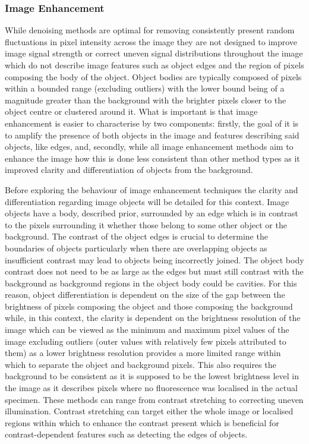 \subsubsection{Image Enhancement}
While denoising methods are optimal for removing consistently present random fluctuations in pixel intensity across the image they are not designed to improve image signal strength or correct uneven signal distributions throughout the image which do not describe image features such as object edges and the region of pixels composing the body of the object. Object bodies are typically composed of pixels within a bounded range (excluding outliers) with the lower bound being of a magnitude greater than the background with the brighter pixels closer to the object centre or clustered around it. What is important is that image enhancement is easier to characterise by two components: firstly, the goal of it is to amplify the presence of both objects in the image and features describing said objects, like edges, and, secondly, while all image enhancement methods aim to enhance the image how this is done less consistent than other method types as it improved clarity and differentiation of objects from the background.\par
Before exploring the behaviour of image enhancement techniques the clarity and differentiation regarding image objects will be detailed for this context. Image objects have a body, described prior, surrounded by an edge which is in contrast to the pixels surrounding it whether those belong to some other object or the background. The contrast of the object edges is crucial to determine the boundaries of objects particularly when there are overlapping objects as insufficient contrast may lead to objects being incorrectly joined. The object body contrast does not need to be as large as the edges but must still contrast with the background as background regions in the object body could be cavities. For this reason, object differentiation is dependent on the size of the gap between the brightness of pixels composing the object and those composing the background while, in this context, the clarity is dependent on the brightness resolution of the image which can be viewed as the minimum and maximum pixel values of the image excluding outliers (outer values with relatively few pixels attributed to them) as a lower brightness resolution provides a more limited range within which to separate the object and background pixels. This also requires the background to be consistent as it is supposed to be the lowest brightness level in the image as it describes pixels where no fluorescence was localised in the actual specimen. These methods can range from contrast stretching to correcting uneven illumination. Contrast stretching can target either the whole image or localised regions within which to enhance the contrast present which is beneficial for contrast-dependent features such as detecting the edges of objects. 
